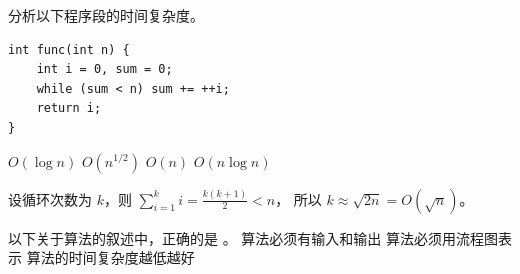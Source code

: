 \begin{qitems}[prefix=（, suffix=）, optprefix=, optsuffix=]

    \begin{bbox}
        \qitem 分析以下程序段的时间复杂度。
        \begin{lstlisting}
int func(int n) {
    int i = 0, sum = 0;
    while (sum < n) sum += ++i;
    return i;
}
        \end{lstlisting}
        \fourchoices
            {$O(\log n)$}
            {$O(n^{1/2})$}
            {$O(n)$}
            {$O(n\log n)$}

        \begin{analysis}
            设循环次数为 $k$，则 $\sum_{i=1}^{k} i = \frac{k(k+1)}{2} < n$，
            所以 $k \approx \sqrt{2n} = O(\sqrt{n})$。
        \end{analysis}
    \end{bbox}

    \begin{bbox}
        \qitem 以下关于算法的叙述中，正确的是 \blankbox 。
        \threechoices
            {算法必须有输入和输出}
            {算法必须用流程图表示}
            {算法的时间复杂度越低越好}
    \end{bbox}

\end{qitems}
